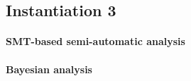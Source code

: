 \subsection{Instantiation 3}
\label{sec:step-by-step-instructions:instantiation-3}

\paragraph{SMT-based semi-automatic analysis}

\paragraph{Bayesian analysis}


